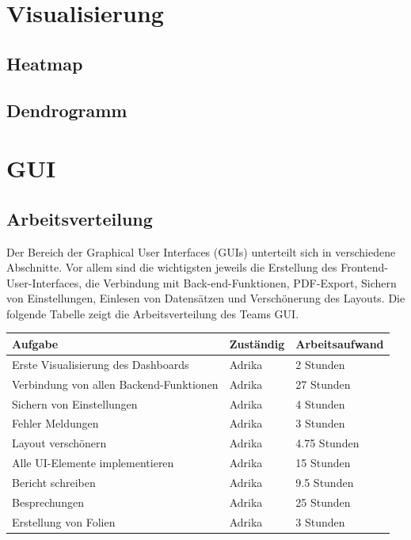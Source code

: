 \documentclass[12pt]{article}
\begin{document}
\newpage
\pagestyle{fancy}
\fancyhead{}
\section{Visualisierung}
\label{visualisierung}

\subsection{Heatmap}
\label{heatmap}

\subsection{Dendrogramm}
\label{dendrogramm}

\newpage
\pagestyle{fancy}
\fancyhead{}

\section{GUI}
\label{gui}

\subsection{Arbeitsverteilung}
\label{GUI-arbeitsverteilung}
Der Bereich der Graphical User Interfaces (GUIs) unterteilt sich in verschiedene Abschnitte. Vor allem sind die wichtigsten jeweils die Erstellung des Frontend-User-Interfaces, die Verbindung mit Back-end-Funktionen, PDF-Export, Sichern von Einstellungen, Einlesen von Datensätzen und Verschönerung des Layouts. Die folgende Tabelle zeigt die Arbeitsverteilung des Teams GUI.

\begin{table}[h]
\centering
	\begin{tabular}{l|l|l}
		Aufgabe & Zuständig & Arbeitsaufwand \\ 
		\hline
		Erste Visualisierung des Dashboards             & Adrika    & 2 Stunden        \\
		Verbindung von allen Backend-Funktionen       & Adrika  &  27 Stunden      \\ 
        Sichern von Einstellungen & Adrika & 4 Stunden \\
		Fehler Meldungen              & Adrika    & 3 Stunden        \\ 
        Layout verschönern & Adrika & 4.75 Stunden \\
        Alle UI-Elemente implementieren & Adrika & 15 Stunden \\
        Bericht schreiben & Adrika & 9.5 Stunden \\
        Besprechungen & Adrika & 25 Stunden \\ 
        Erstellung von Folien & Adrika & 3 Stunden 

        
	\end{tabular}
\end{table}
\end{document}
